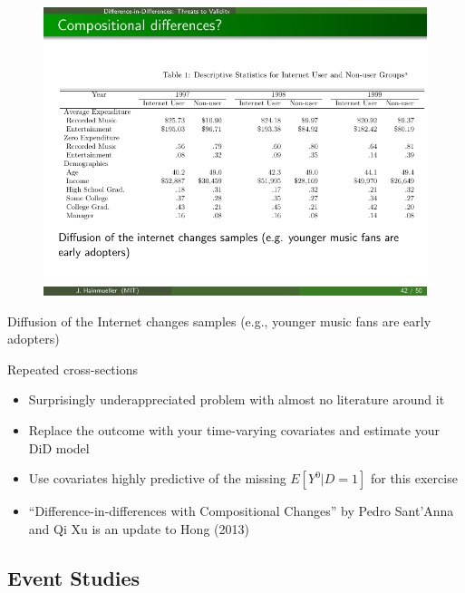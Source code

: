 \documentclass{beamer}
\begin{document}
\begin{frame}[shrink=20,plain]
	\begin{figure}
	\includegraphics{./lecture_includes/Hong_2.pdf}
	\end{figure}
	
	Diffusion of the Internet changes samples (e.g., younger music fans are early adopters)
	
\end{frame}

\begin{frame}{Repeated cross-sections}

\begin{itemize}
\item Surprisingly underappreciated problem with almost no literature around it
\item Replace the outcome with your time-varying covariates and estimate your DiD model
\item Use covariates highly predictive of the missing $E[Y^0|D=1]$ for this exercise
\item ``Difference-in-differences with Compositional Changes'' by Pedro Sant'Anna and Qi Xu is an update to Hong (2013)
\end{itemize}

\end{frame}


\subsection{Event Studies}
\end{document}
